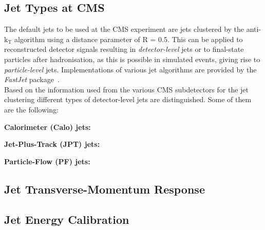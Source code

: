 \subsection{Jet Types at CMS}
\label{subsec:jets_types}
The default jets to be used at the CMS experiment are jets clustered by the anti-$\mathrm{k_T}$ algorithm using a distance parameter of R = 0.5. This can be applied to reconstructed detector signals resulting in \textit{detector-level} jets or to final-state particles after hadronisation, as this is possible in simulated events, giving rise to \textit{particle-level} jets. Implementations of various jet algorithms are provided by the \textit{FastJet} package~\cite{Cacciari:2011ma, Cacciari:2005hq}. \\
Based on the information used from the various CMS subdetectors for the jet clustering different types of detector-level jets are distinguished. Some of them are the following:
\begin{description}
 \item \textbf{Calorimeter (Calo) jets:}
 \item \textbf{Jet-Plus-Track (JPT) jets:}
 \item \textbf{Particle-Flow (PF) jets:}
\end{description}

\subsection{Jet Transverse-Momentum Response}
\label{subsec:jets_response}

\subsection{Jet Energy Calibration}
\label{subsec:jets_calib}


